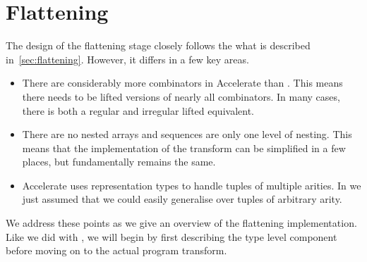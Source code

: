 \section{Flattening}
\label{sec:flattening-impl}

The design of the flattening stage closely follows the what is described in~\ref{sec:flattening}. However, it differs in a few key areas.
%
\begin{itemize}
\item There are considerably more combinators in Accelerate than \ndp{}. This means there needs to be lifted versions of nearly all combinators. In many cases, there is both a regular and irregular lifted equivalent.
%
%
\item There are no nested arrays and sequences are only one level of nesting. This means that the implementation of the transform can be simplified in a few places, but fundamentally remains the same.
%
%
\item Accelerate uses representation types to handle tuples of multiple arities. In \ndp{} we just assumed that we could easily generalise over tuples of arbitrary arity.
%
\end{itemize}
%
We address these points as we give an overview of the flattening implementation. Like we did with \ndp{}, we will begin by first describing the type level component before moving on to the actual program transform.

